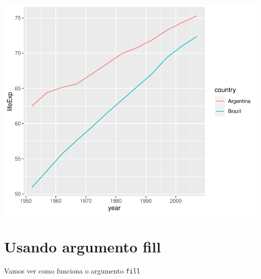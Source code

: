 \documentclass[
]{article}
\newenvironment{Shaded}{\begin{snugshade}}{\end{snugshade}}
\newcommand{\DataTypeTok}[1]{\textcolor[rgb]{0.13,0.29,0.53}{#1}}
\newcommand{\DecValTok}[1]{\textcolor[rgb]{0.00,0.00,0.81}{#1}}
\newcommand{\KeywordTok}[1]{\textcolor[rgb]{0.13,0.29,0.53}{\textbf{#1}}}
\newcommand{\NormalTok}[1]{#1}
\newcommand{\OperatorTok}[1]{\textcolor[rgb]{0.81,0.36,0.00}{\textbf{#1}}}
\newcommand{\StringTok}[1]{\textcolor[rgb]{0.31,0.60,0.02}{#1}}
\begin{document}
\begin{center}\includegraphics{arquivo_pdf_files/figure-latex/linhas2-1} \end{center}

\hypertarget{usando-argumento-fill}{%
\section{Usando argumento fill}\label{usando-argumento-fill}}

Vamos ver como funciona o argumento \texttt{fill}

\begin{Shaded}
\end{Shaded}
\end{document}
